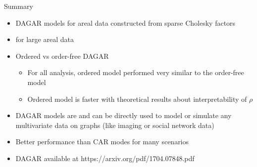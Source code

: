\begin{frame}{Summary}
	\begin{itemize}
	    \item DAGAR models for areal data constructed from sparse Cholesky factors
	    \item {} for large areal data
		\item Ordered vs order-free DAGAR
		\begin{itemize}
			\item For all analysis, ordered model performed very similar to the order-free model
			\item Ordered model is faster with theoretical results about interpretability of $\rho$
		\end{itemize}
		\item DAGAR models are  and can be directly used to model or simulate any multivariate data on graphs (like imaging or social network data)
		\item Better performance than CAR modes for many scenarios
		\item DAGAR available at  https://arxiv.org/pdf/1704.07848.pdf
	\end{itemize}
\end{frame}


